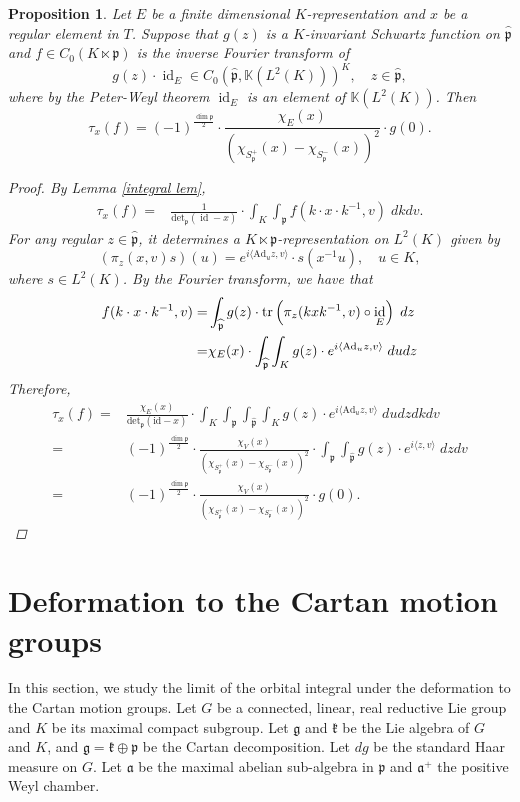 \documentclass{amsproc}
\newtheorem{proposition}[theorem]{Proposition}
\theoremstyle{definition}
\theoremstyle{remark}
\numberwithin{equation}{section}
\DeclareMathOperator{\id}{id}
\newcommand{\ka}{\mathfrak{a}}
\newcommand{\kg}{\mathfrak{g}}
\newcommand{\kk}{\mathfrak{k}}
\newcommand{\kp}{\mathfrak{p}}
\newcommand{\bK}{\mathbb{K}}
\begin{document}
\begin{proposition}
\label{prop tau}
Let $E$ be a finite dimensional $K$-representation and  $x$ be a regular element in $T$. Suppose that $g(z)$ is a $K$-invariant Schwartz function on $\widehat{\kp}$ and  $f \in C_0(K \ltimes \kp)$ is the inverse Fourier transform of 
\[
g(z) \cdot \id_E \in  C_0 \left(\widehat{\kp}, \bK \left(L^2(K)\right) \right)^K, \quad z \in \widehat{\kp},
\]
where by the Peter-Weyl theorem $\id_E$ is an element of $\bK \left(L^2(K)\right)$.
Then  
\[
\tau_x(f) = (-1)^{\frac{\dim \kp}{2}} \cdot \frac{\chi_E(x) }{\left(\chi_{S_\kp^+}(x) -\chi_{S_\kp^-}(x) \right)^2} \cdot g(0). 
\]	
\begin{proof}
By Lemma \ref{integral lem},  
\[
\begin{aligned}
\tau_x(f) =& \frac{1}{\text{det}_\kp(\id - x)} \cdot \int_K \int_\kp f(k\cdot x \cdot k^{-1}, v ) \; dk dv. 
\end{aligned}
\]	
For any regular $z\in \widehat{\kp}$, it determines a $K \ltimes \kp$-representation on $L^2(K)$ given by 
\[
\left(\pi_z(x, v)s\right)(u) = e^{i\langle \mathrm{Ad}_uz, v\rangle } \cdot s(x^{-1}u), \quad u \in K,
\]
where $s \in L^2(K)$. By the Fourier transform, we have that 
\[
\begin{aligned}
f(k\cdot x \cdot k^{-1}, v ) =& \int_{\widehat{\kp}}g(z) \cdot \tr\left(\pi_z(kx k^{-1}, v) \circ \id_E \right) \; dz\\
=&\chi_E(x) \cdot \int_{\widehat{\kp}}\int_K g(z) \cdot e^{i\langle \mathrm{Ad}_uz, v\rangle } \; du dz
\end{aligned}
\]
Therefore, 
\[
\begin{aligned}
\tau_x(f) =&  \frac{\chi_E(x)}{\text{det}_\kp(\text{id} - x)} \cdot \int_K \int_\kp \int_{\widehat{\kp}}\int_K g(z) \cdot e^{i\langle \mathrm{Ad}_uz, v\rangle } \; du dz dk dv\\
=& (-1)^{\frac{\dim \kp}{2}} \cdot\frac{\chi_V(x) }{\left(\chi_{S_\kp^+}(x) -\chi_{S_\kp^-}(x) \right)^2} \cdot \int_\kp\int_{\widehat{\kp}}g(z) \cdot e^{i \langle z, v\rangle} \; dzdv\\
=& (-1)^{\frac{\dim \kp}{2}} \cdot\frac{\chi_V(x) }{\left(\chi_{S_\kp^+}(x) -\chi_{S_\kp^-}(x) \right)^2} \cdot g(0). 
\end{aligned}
\]
\end{proof}

\end{proposition}



\section{Deformation to the Cartan motion groups}\label{sec:limit}
In this section, we study the limit of the orbital integral under the deformation to the Cartan motion groups. Let $G$ be a connected, linear,  real reductive Lie group and $K$ be its maximal compact subgroup. Let $\kg$ and $\kk$ be the Lie algebra of $G$ and $K$, and $\kg = \kk \oplus \kp$ be the Cartan decomposition. Let $dg$ be the standard Haar measure on $G$. Let $\ka$ be the maximal abelian sub-algebra in $\kp$ and $\ka^+$ the positive Weyl chamber. 
\end{document}
